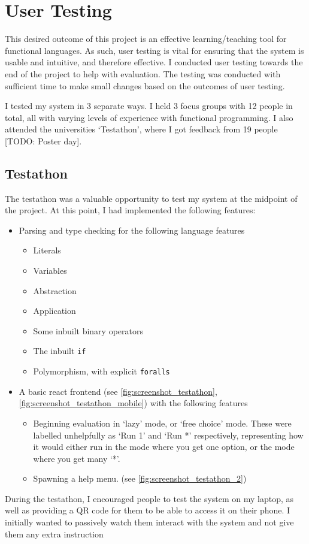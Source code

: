 \chapter{User Testing}
\label{chap:evaluation}

This desired outcome of this project is an effective learning/teaching tool for functional languages. As such, user testing is vital for ensuring that the system is usable and intuitive, and therefore effective. I conducted user testing towards the end of the project to help with evaluation. The testing was conducted with sufficient time to make small changes based on the outcomes of user testing.

I tested my system in 3 separate ways. I held 3 focus groups with 12 people in total, all with varying levels of experience with functional programming. I also attended the universities `Testathon', where I got feedback from 19 people [TODO: Poster day].

\section{Testathon}
The testathon was a valuable opportunity to test my system at the midpoint of the project. At this point, I had implemented the following features:

\begin{itemize}
    \item Parsing and type checking for the following language features
    \begin{itemize}
        \item Literals
        \item Variables
        \item Abstraction 
        \item Application
        \item Some inbuilt binary operators 
        \item The inbuilt \verb|if|
        \item Polymorphism, with explicit \verb|foralls|
    \end{itemize}
\item A basic react frontend (see \ref{fig:screenshot_testathon}, \ref{fig:screenshot_testathon_mobile}) with the following features
\begin{itemize}
    \item Beginning evaluation in `lazy' mode, or `free choice' mode. These were labelled unhelpfully as `Run 1' and `Run *' respectively, representing how it would either run in the mode where you get one option, or the mode where you get many `*'.
    \item Spawning a help menu. (see \ref{fig:screenshot_testathon_2})
\end{itemize}
\end{itemize}

During the testathon, I encouraged people to test the system on my laptop, as well as providing a QR code for them to be able to access it on their phone. I initially wanted to passively watch them interact with the system and not give them any extra instruction